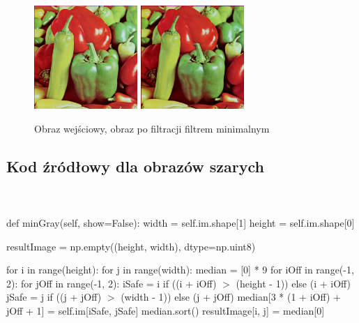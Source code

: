 \documentclass[final,a4paper,openany,12pt]{mwbk}
\begin{document}
\begin{figure}[H]
	\begin{center}
		\includegraphics[width=0.35\textwidth]{peppers_color}
		\includegraphics[width=0.35\textwidth]{peppers_color_min_result}
	\end{center}
	\caption{Obraz wejściowy, obraz po filtracji filtrem minimalnym}
\end{figure}

\newpage

\subsection*{Kod źródłowy dla obrazów szarych}
\hfill
\\\\
\noindent def minGray(self, show=False): \newline
\indent width = self.im.shape[1] \newline
\indent height = self.im.shape[0] \newline

resultImage = np.empty((height, width), dtype=np.uint8) \newline

for i in range(height): \newline
\indent for j in range(width): \newline
\indent median = [0] * 9 \newline
\indent for iOff in range(-1, 2): \newline
\indent for jOff in range(-1, 2): \newline
\indent iSafe = i if ((i + iOff) $>$ (height - 1)) else (i + iOff) \newline
\indent jSafe = j if ((j + jOff) $>$ (width - 1)) else (j + jOff) \newline
\indent median[3 * (1 + iOff) + jOff + 1] = self.im[iSafe, jSafe] \newline
\indent median.sort() \newline
\indent resultImage[i, j] = median[0] \newline
\end{document}
